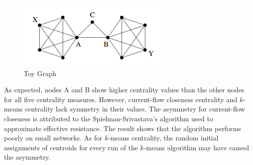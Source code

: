 \documentclass[10pt]{siamltex}
\begin{document}
\begin{pagewiselinenumbers}
\begin{figure}[ht]
\begin{center}
\includegraphics[width=0.56\columnwidth]{toy1}
\end{center}
\caption{Toy Graph}
\label{fig:ToyGraph}
\end{figure}
As expected, nodes A and B show higher centrality values than the other nodes for all five centrality measures. However, current-flow closeness centrality and $k$-means centrality lack symmetry in their values. The asymmetry for current-flow closeness is attributed to the Spielman-Srivastava's algorithm used to approximate effective resistance. The result shows that the algorithm performs poorly on small networks. As for $k$-means centrality, the random initial assignments of centroids for every run of the $k$-means algorithm may have caused the asymmetry. 
\begin{figure}[ht]
\centering
{}
\end{figure}
\end{pagewiselinenumbers}
\end{document}
